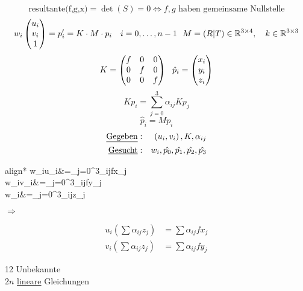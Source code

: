 \[ \text{resultante(f,g,x)} = \det(S) = 0 \Leftrightarrow f,g\text{ haben gemeinsame Nullstelle} \]
\[ w_i \begin{pmatrix}u_i\\v_i\\1\end{pmatrix} = p_i' = K\cdot M \cdot p_i ~~~ i = 0,\ldots,n-1 ~~ M=\left( R|T \right) \in \mathbb{R}^{3\times4}, ~~~ k\in \mathbb{R}^{3\times3} \]
\[ K = \begin{pmatrix}f&0&0\\0&f&0\\0&0&f\end{pmatrix} ~~ \hat{p}_i = \begin{pmatrix}x_i\\y_i\\z_i\end{pmatrix} \]
\[ Kp_i = \sum_{j=0}^{3}\alpha_{ij}Kp_j \]
\[ \hat{p}_i = Mp_i \]
\begin{align*}
\text{\underline{Gegeben}} & : & \left( u_i, v_i \right), K, \alpha_{ij}\\
\text{\underline{Gesucht}} & : & w_i, \hat{p_0},\hat{p_1},\hat{p_2},\hat{p_3}
\end{align*}
\begin{minipage}{.4\textwidth}
	\begin{empheq}[box=\widefbox]{align*}
	w_iu_i&=\sum_{j=0}^{3}\alpha_{ij}f\cdot x_j\\
	w_iv_i&=\sum_{j=0}^{3}\alpha_{ij}f\cdot y_j\\
	w_i&=\sum_{j=0}^{3}\alpha_{ij}\cdot z_j
\end{empheq}
\end{minipage}
\hspace*{-2em}
$\Rightarrow$ 
\hspace*{-2em}
\begin{minipage}{.4\textwidth}
\begin{align*}
	u_i\left( \sum\alpha_{ij}z_j \right) &= \sum\alpha_{ij}fx_j\\
	v_i\left( \sum\alpha_{ij}z_j \right) &= \sum\alpha_{ij}fy_j
\end{align*}
\end{minipage}
\begin{minipage}{.5\textwidth}
	12 Unbekannte\\
	$2n$ \underline{lineare} Gleichungen
\end{minipage}
\pagebreak
